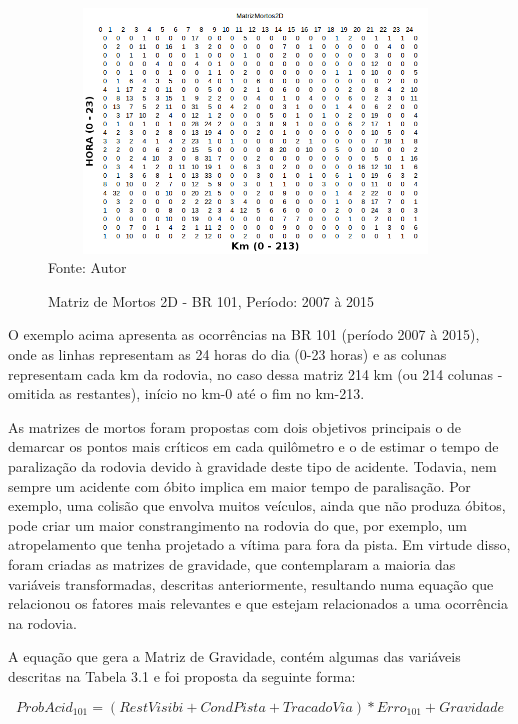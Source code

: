 \pagebreak

\begin{figure}[!ht]
\centering
\caption{Matriz de Mortos 2D - BR 101, Período: 2007 à 2015}
\label{fig:MatrizMortos2D}
\includegraphics[width=110mm, height=65mm]{Figuras/Metodologia/MatrizMortos2D}\\
\tiny Fonte: Autor
\end{figure}

O exemplo acima apresenta as ocorrências na BR 101 (período 2007 à 2015), onde as linhas representam as 24 horas do dia (0-23 horas) e as colunas representam cada km da rodovia, no caso dessa matriz 214 km (ou 214 colunas - omitida as restantes), início no km-0 até o fim no km-213.



As matrizes de mortos foram propostas com dois objetivos principais o de demarcar os pontos mais críticos em cada quilômetro e o de estimar o tempo de paralização da rodovia devido à gravidade deste tipo de acidente. Todavia, nem sempre um acidente com óbito implica em maior tempo de paralisação. Por exemplo, uma colisão que envolva muitos veículos, ainda que não produza óbitos, pode criar um maior constrangimento na rodovia do que, por exemplo, um atropelamento que tenha projetado a vítima para fora da pista. Em virtude disso, foram criadas as matrizes de gravidade, que contemplaram a maioria das variáveis transformadas, descritas anteriormente, resultando numa equação que relacionou os fatores mais relevantes e que estejam relacionados a uma ocorrência na rodovia. 

\vspace{5mm}

A equação que gera a Matriz de Gravidade, contém algumas das variáveis descritas na Tabela 3.1 e foi proposta da seguinte forma: 

\begin{equation}
ProbAcid_{101} = (RestVisibi + CondPista + TracadoVia) *  Erro_{101} + Gravidade
\end{equation} 

